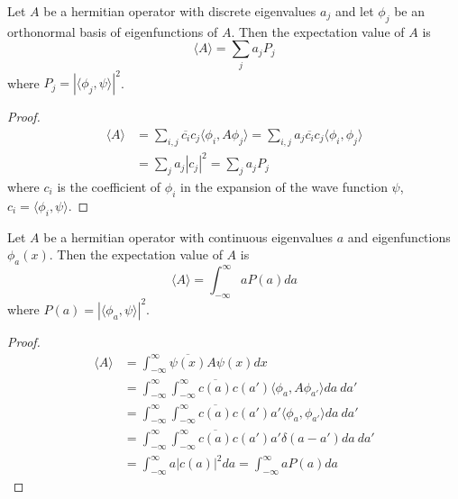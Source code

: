 \begin{proposition}
	Let $A$ be a hermitian operator with discrete eigenvalues $a_j$ and let $\phi_j$ be an orthonormal basis of eigenfunctions of $A$. Then the expectation value of $A$ is
	\[
		\langle A \rangle = \sum_j a_j P_j
	\]
	where $P_j = |\langle \phi_j, \psi \rangle|^2$.
\end{proposition}

\begin{proof}
	\[
		\begin{aligned}
			\langle A \rangle & = \sum_{i, j} \overline{c_i} c_j \langle \phi_i, A \phi_j \rangle = \sum_{i, j} a_j \overline{c_i} c_j \langle \phi_i, \phi_j \rangle \\
			& = \sum_j a_j |c_j|^2 = \sum_j a_j P_j
		\end{aligned}
	\]
	where $c_i$ is the coefficient of $\phi_i$ in the expansion of the wave function $\psi$, $c_i = \langle \phi_i, \psi \rangle$.
\end{proof}

\begin{proposition}
	Let $A$ be a hermitian operator with continuous eigenvalues $a$ and eigenfunctions $\phi_a(x)$. Then the expectation value of $A$ is
	\[
		\langle A \rangle = \int_{-\infty}^{\infty} a P(a) da
	\]
	where $P(a) = |\langle \phi_a, \psi \rangle|^2$.
\end{proposition}

\begin{proof}
	\[
		\begin{aligned}
			\langle A \rangle & = \int_{-\infty}^{\infty} \overline{\psi(x)} A \psi(x) dx \\
			& = \int_{-\infty}^{\infty} \int_{-\infty}^{\infty} \overline{c(a)} c(a') \langle \phi_a, A \phi_{a'} \rangle da \ da' \\
			& = \int_{-\infty}^{\infty} \int_{-\infty}^{\infty} \overline{c(a)} c(a') a' \langle \phi_a, \phi_{a'} \rangle da \ da' \\
			& = \int_{-\infty}^{\infty} \int_{-\infty}^{\infty} \overline{c(a)} c(a') a' \delta(a - a') da \ da' \\
			& = \int_{-\infty}^{\infty} a |c(a)|^2 da = \int_{-\infty}^{\infty} a P(a) da
		\end{aligned}
	\]
\end{proof}

